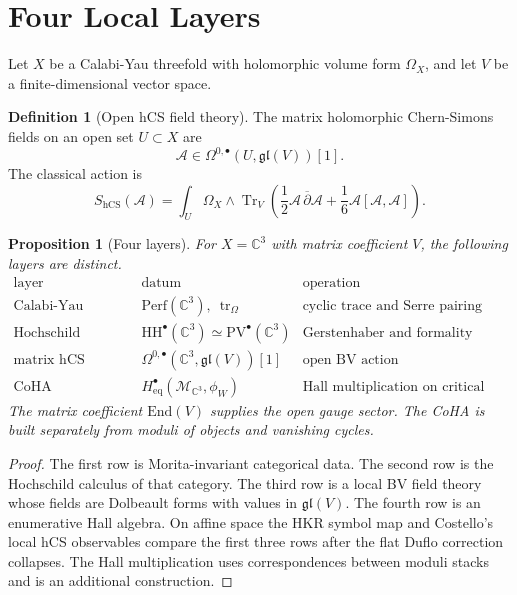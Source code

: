 \documentclass[11pt]{amsart}
\newtheorem{proposition}[theorem]{Proposition}
\theoremstyle{definition}
\newtheorem{definition}[theorem]{Definition}
\theoremstyle{remark}
\providecommand{\End}{\mathrm{End}}
\providecommand{\HH}{\mathrm{HH}}
\providecommand{\Perf}{\mathrm{Perf}}
\providecommand{\PV}{\mathrm{PV}}
\providecommand{\cA}{\mathcal A}
\providecommand{\dbar}{\overline{\partial}}
\providecommand{\fgl}{\mathfrak{gl}}
\providecommand{\hCS}{\mathrm{hCS}}
\providecommand{\C}{\mathbb C}
\begin{document}
\section{Four Local Layers}
\label{sec:layers}

Let $X$ be a Calabi-Yau threefold with holomorphic volume form
$\Omega_X$, and let $V$ be a finite-dimensional vector space.

\begin{definition}[Open hCS field theory]
\label{def:hcs-fields}
The matrix holomorphic Chern-Simons fields on an open set $U\subset X$
are
\[
  \cA\in\Omega^{0,\bullet}(U,\fgl(V))[1].
\]
The classical action is
\[
  S_{\hCS}(\cA)
  =
  \int_U\Omega_X\wedge
  \operatorname{Tr}_V\left(
    \frac12\cA\,\dbar\cA+
    \frac16\cA[\cA,\cA]\right).
\]
\end{definition}

\begin{proposition}[Four layers]
\label{prop:four-layers}
For $X=\C^3$ with matrix coefficient $V$, the following layers are
distinct.
\[
\begin{array}{c|c|c}
\text{layer} & \text{datum} & \text{operation}\\
\hline
\text{Calabi-Yau category} & \Perf(\C^3),\ \operatorname{tr}_{\Omega} &
  \text{cyclic trace and Serre pairing}\\
\text{Hochschild polyvectors} & \HH^\bullet(\C^3)\simeq\PV^\bullet(\C^3) &
  \text{Gerstenhaber and formality calculus}\\
\text{matrix hCS} & \Omega^{0,\bullet}(\C^3,\fgl(V))[1] &
  \text{open BV action}\\
\text{CoHA} & H^\bullet_{\mathrm{eq}}(\mathcal M_{\C^3},\phi_W) &
  \text{Hall multiplication on critical sheaf moduli}
\end{array}
\]
The matrix coefficient $\End(V)$ supplies the open gauge sector. The
CoHA is built separately from moduli of objects and vanishing cycles.
\end{proposition}

\begin{proof}
The first row is Morita-invariant categorical data. The second row is
the Hochschild calculus of that category. The third row is a local BV
field theory whose fields are Dolbeault forms with values in
$\fgl(V)$. The fourth row is an enumerative Hall algebra. On affine
space the HKR symbol map and Costello's local hCS observables compare
the first three rows after the flat Duflo correction collapses. The
Hall multiplication uses correspondences between moduli stacks and is
an additional construction.
\end{proof}
\end{document}
